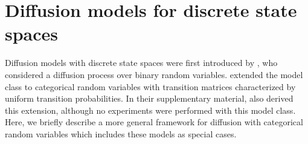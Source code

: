 \section{Diffusion models for discrete state spaces}
\label{sec:discrete_diffusion}

Diffusion models with discrete state spaces were first introduced by \citet{sohl2015deep}, who considered a diffusion process over binary random variables.
\citet{hoogeboom2021argmax} extended
the model class to categorical random variables with transition matrices characterized by uniform transition probabilities. In their supplementary material, \citet{song2021implicit} also derived this extension, although no experiments were performed with this model class.
Here, we briefly describe a more general framework for diffusion with categorical random variables which includes these models as special cases.

